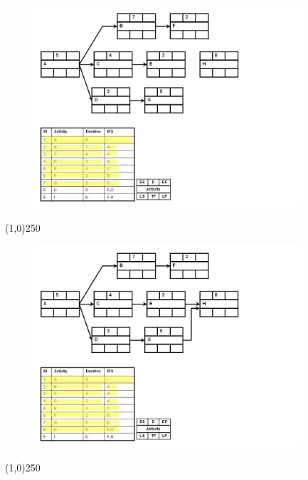 \begin{frame}
\begin{figure}
	\centering
		\includegraphics[width = 10.0cm]{oldnotes/Slide136.jpg}
\end{figure}
\end{frame}
\begin{center}\line(1,0){250}\end{center}




\begin{frame}
\begin{figure}
	\centering
		\includegraphics[width = 10.0cm]{oldnotes/Slide137.jpg}
\end{figure}
\end{frame}
\begin{center}\line(1,0){250}\end{center}




